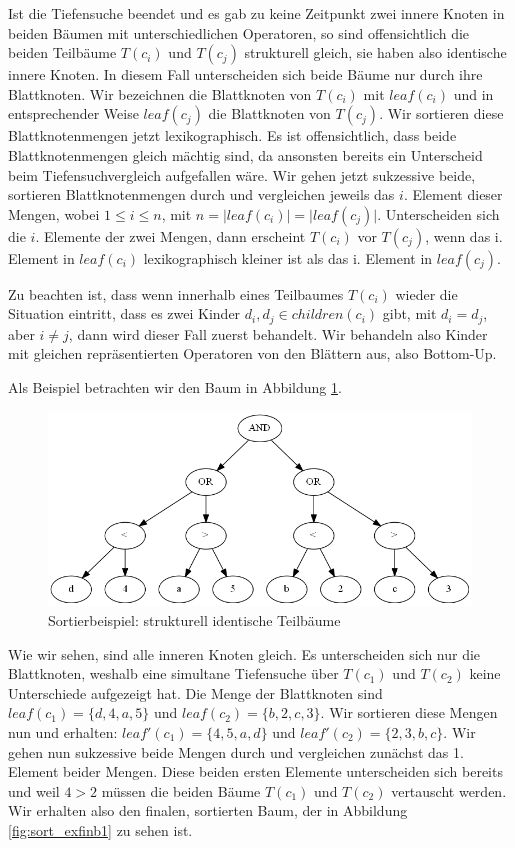 Ist die Tiefensuche beendet und es gab zu keine Zeitpunkt zwei innere Knoten in beiden Bäumen mit unterschiedlichen Operatoren, so sind offensichtlich die beiden Teilbäume $T(c_i)$ und $T(c_j)$ strukturell gleich, sie haben also identische innere Knoten. In diesem Fall unterscheiden sich beide Bäume nur durch ihre Blattknoten. Wir bezeichnen die Blattknoten von $T(c_i)$ mit $leaf(c_i)$ und in entsprechender Weise $leaf(c_j)$ die Blattknoten von $T(c_j)$. Wir sortieren diese Blattknotenmengen jetzt lexikographisch. Es ist offensichtlich, dass beide Blattknotenmengen gleich mächtig sind, da ansonsten bereits ein Unterscheid beim Tiefensuchvergleich aufgefallen wäre. Wir gehen jetzt sukzessive beide, sortieren Blattknotenmengen durch und vergleichen jeweils das $i.$ Element dieser Mengen, wobei $1\le i \le n$, mit $n=\vert \mathit{leaf}(c_i)\vert = \vert \mathit{leaf}(c_j) \vert$. Unterscheiden sich die $i.$ Elemente der zwei Mengen, dann erscheint $T(c_i)$ vor $T(c_j)$, wenn das i. Element in $\mathit{leaf(c_i)}$ lexikographisch kleiner ist als das i. Element in $\mathit{leaf(c_j)}$.

Zu beachten ist, dass wenn innerhalb eines Teilbaumes $T(c_i)$ wieder die Situation eintritt, dass es zwei Kinder $d_i,d_j\in\mathit{children}(c_i)$ gibt, mit $d_i=d_j$, aber $i\neq j$, dann wird dieser Fall zuerst behandelt. Wir behandeln also Kinder mit gleichen repräsentierten Operatoren von den Blättern aus, also Bottom-Up.

Als Beispiel betrachten wir den Baum in Abbildung \ref{fig:sort_exfinb0}.

\begin{figure}
\includegraphics[scale=0.55]{Bilder/sort_exfinb0.png}
\caption{Sortierbeispiel: strukturell identische Teilbäume}
\label{fig:sort_exfinb0}
\end{figure}

Wie wir sehen, sind alle inneren Knoten gleich. Es unterscheiden sich nur die Blattknoten, weshalb eine simultane Tiefensuche über $T(c_1)$ und $T(c_2)$ keine Unterschiede aufgezeigt hat. Die Menge der Blattknoten sind $\mathit{leaf}(c_1) = \{d,4,a,5\}$ und $\mathit{leaf}(c_2) = \{b,2,c,3\}$. Wir sortieren diese Mengen nun und erhalten: $\mathit{leaf'}(c_1) = \{4,5,a,d\}$ und $\mathit{leaf'}(c_2) = \{2,3,b,c\}$.
Wir gehen nun sukzessive beide Mengen durch und vergleichen zunächst das 1. Element beider Mengen. Diese beiden ersten Elemente unterscheiden sich bereits und weil $4 > 2$ müssen die beiden Bäume $T(c_1)$ und $T(c_2)$ vertauscht werden. Wir erhalten also den finalen, sortierten Baum, der in Abbildung \ref{fig:sort_exfinb1} zu sehen ist.

